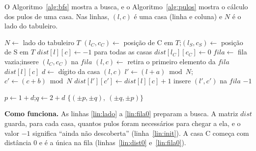 O Algoritmo~\ref{alg:bfs} mostra a busca, e o Algoritmo~\ref{alg:pulos} mostra o cálculo dos
pulos de uma casa. Nas linhas, $(l, c)$ é uma casa (linha e coluna) e $N$ é o lado do
tabuleiro.

\begin{algorithm}[ht]
  \caption{Menor número de movimentos do cavalo de C até S}
  \label{alg:bfs}
  \begin{algorithmic}[1]
      \State $N \gets$ lado do tabuleiro $T$ \label{lin:lado}
      \State $(l_C, c_C) \gets$ posição de C em $T$;\quad $(l_S, c_S) \gets$ posição de S em $T$ \label{lin:pos}
      \State $dist[l][c] \gets -1$ para todas as casas \label{lin:init}
      \State $dist[l_C][c_C] \gets 0$ \label{lin:dist0}
      \State $fila \gets$ fila vazia;\quad insere $(l_C, c_C)$ na $fila$ \label{lin:fila0}
       \label{lin:while}
        \State $(l, c) \gets$ retira o primeiro elemento da $fila$ \label{lin:retira}
         \label{lin:teste}
          \State \Return $dist[l][c]$ \label{lin:resposta}
        \EndIf
        \State $d \gets$ dígito da casa $(l, c)$  \label{lin:digito}
         \label{lin:for}
          \State $l' \gets (l + a) \bmod N$;\quad $c' \gets (c + b) \bmod N$ \label{lin:mod}
           \label{lin:novo}
            \State $dist[l'][c'] \gets dist[l][c] + 1$ \label{lin:marca}
            \State insere $(l', c')$ na $fila$ \label{lin:insere}
          \EndIf
        \EndFor
      \EndWhile
      \State \Return $-1$  \label{lin:imposs}
    \EndFunction
  \end{algorithmic}
\end{algorithm}

\begin{algorithm}[ht]
  \caption{Pulos possíveis a partir de uma casa com dígito $d$}
  \label{alg:pulos}
  \begin{algorithmic}[1]
      \State $p \gets 1 + d$;\quad $q \gets 2 + d$ \label{lin:pq}
      \State \Return $\{(\pm p, \pm q),\ (\pm q, \pm p)\}$  \label{lin:oito}
    \EndFunction
  \end{algorithmic}
\end{algorithm}

\textbf{Como funciona.} As linhas \ref{lin:lado} a \ref{lin:fila0} preparam a busca. A matriz
$dist$ guarda, para cada casa, quantos pulos foram necessários para chegar a ela, e o valor
$-1$ significa ``ainda não descoberta'' (linha~\ref{lin:init}). A casa C começa com distância 0
e é a única na fila (linhas~\ref{lin:dist0} e~\ref{lin:fila0}).

